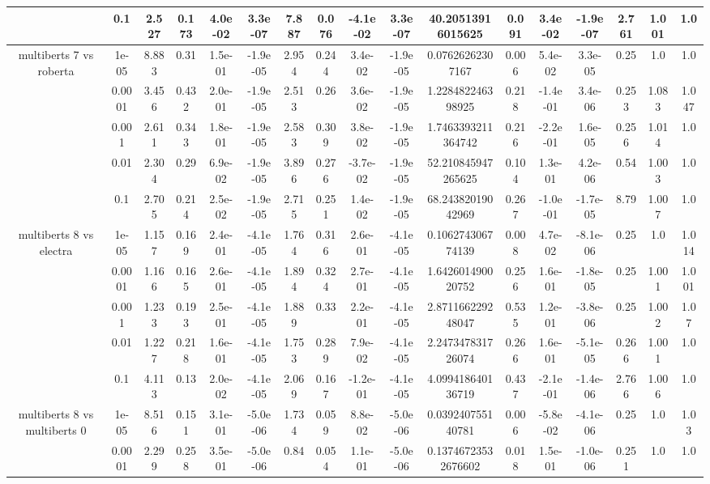 \begin{tabular}{|c|c|c|c|c|c|c|c|c|c|c|c|c|c|c|c|c|}
 & 0.1 & 2.527 & 0.173 & 4.0e-02 & 3.3e-07 & 7.887 & 0.076 & -4.1e-02 & 3.3e-07 & 40.20513916015625 & 0.091 & 3.4e-02 & -1.9e-07 & 2.761 & 1.001 & 1.0 \\
\hline
\multirow{5}{*}{multiberts 7 vs roberta } & 1e-05 & 8.883 & 0.31 & 1.5e-01 & -1.9e-05 & 2.954 & 0.244 & 3.4e-02 & -1.9e-05 & 0.07626262307167 & 0.006 & 5.4e-02 & 3.3e-05 & 0.25 & 1.0 & 1.0 \\
 & 0.0001 & 3.456 & 0.432 & 2.0e-01 & -1.9e-05 & 2.513 & 0.26 & 3.6e-02 & -1.9e-05 & 1.228482246398925 & 0.218 & -1.4e-01 & 3.4e-06 & 0.253 & 1.083 & 1.047 \\
 & 0.001 & 2.611 & 0.343 & 1.8e-01 & -1.9e-05 & 2.583 & 0.309 & 3.8e-02 & -1.9e-05 & 1.7463393211364742 & 0.216 & -2.2e-01 & 1.6e-05 & 0.256 & 1.014 & 1.0 \\
 & 0.01 & 2.304 & 0.29 & 6.9e-02 & -1.9e-05 & 3.896 & 0.276 & -3.7e-02 & -1.9e-05 & 52.210845947265625 & 0.104 & 1.3e-01 & 4.2e-06 & 0.54 & 1.003 & 1.0 \\
 & 0.1 & 2.705 & 0.214 & 2.5e-02 & -1.9e-05 & 2.715 & 0.251 & 1.4e-02 & -1.9e-05 & 68.24382019042969 & 0.267 & -1.0e-01 & -1.7e-05 & 8.79 & 1.007 & 1.0 \\
\hline
\multirow{5}{*}{multiberts 8 vs electra } & 1e-05 & 1.157 & 0.169 & 2.4e-01 & -4.1e-05 & 1.764 & 0.316 & 2.6e-01 & -4.1e-05 & 0.106274306774139 & 0.008 & 4.7e-02 & -8.1e-06 & 0.25 & 1.0 & 1.014 \\
 & 0.0001 & 1.166 & 0.165 & 2.6e-01 & -4.1e-05 & 1.894 & 0.324 & 2.7e-01 & -4.1e-05 & 1.642601490020752 & 0.256 & 1.6e-01 & -1.8e-05 & 0.25 & 1.001 & 1.001 \\
 & 0.001 & 1.233 & 0.193 & 2.5e-01 & -4.1e-05 & 1.889 & 0.33 & 2.2e-01 & -4.1e-05 & 2.871166229248047 & 0.535 & 1.2e-01 & -3.8e-06 & 0.25 & 1.002 & 1.07 \\
 & 0.01 & 1.227 & 0.218 & 1.6e-01 & -4.1e-05 & 1.753 & 0.289 & 7.9e-02 & -4.1e-05 & 2.247347831726074 & 0.266 & 1.6e-01 & -5.1e-05 & 0.266 & 1.001 & 1.0 \\
 & 0.1 & 4.113 & 0.13 & 2.0e-02 & -4.1e-05 & 2.069 & 0.167 & -1.2e-01 & -4.1e-05 & 4.099418640136719 & 0.437 & -2.1e-01 & -1.4e-06 & 2.766 & 1.006 & 1.0 \\
\hline
\multirow{5}{*}{multiberts 8 vs multiberts 0} & 1e-05 & 8.516 & 0.151 & 3.1e-01 & -5.0e-06 & 1.734 & 0.059 & 8.8e-02 & -5.0e-06 & 0.039240755140781 & 0.006 & -5.8e-02 & -4.1e-06 & 0.25 & 1.0 & 1.03 \\
 & 0.0001 & 2.299 & 0.258 & 3.5e-01 & -5.0e-06 & 0.84 & 0.054 & 1.1e-01 & -5.0e-06 & 0.13746723532676602 & 0.018 & 1.5e-01 & -1.0e-06 & 0.251 & 1.0 & 1.0 \\

\end{tabular}

